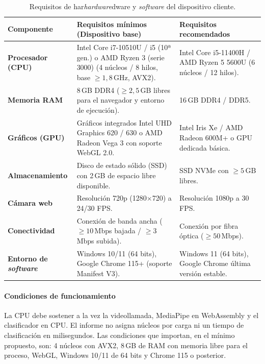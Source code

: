 \begin{table}[H]
\centering
\small
\renewcommand{\arraystretch}{1.3}
\caption{Requisitos de har\textit{hardware}dware y \textit{software} del dispositivo cliente.}
\label{tab:requisitos_hardware}
\begin{tabularx}{\textwidth}{@{}l p{5.5cm} X @{}}
\toprule
\textbf{Componente} & \textbf{Requisitos mínimos (Dispositivo base)} & \textbf{Requisitos recomendados} \\
\midrule
\textbf{Procesador (CPU)} & Intel Core i7-10510U / i5 (10ª gen.) o AMD Ryzen 3 (serie 3000) (4 núcleos / 8 hilos, base $\ge 1{,}8$\,GHz, AVX2). & Intel Core i5-11400H / AMD Ryzen 5 5600U (6 núcleos / 12 hilos). \\
\textbf{Memoria RAM} & 8\,GB DDR4 ($\ge 2{,}5$\,GB libres para el navegador y entorno de ejecución). & 16\,GB DDR4 / DDR5. \\
\textbf{Gráficos (GPU)} & Gráficos integrados Intel UHD Graphics 620 / 630 o AMD Radeon Vega 3 con soporte WebGL 2.0. & Intel Iris Xe / AMD Radeon 600M+ o GPU dedicada básica. \\
\textbf{Almacenamiento} & Disco de estado sólido (SSD) con 2\,GB de espacio libre disponible. & SSD NVMe con $\ge 5$\,GB libres. \\
\textbf{Cámara web} & Resolución 720p (1280$\times$720) a 24/30 FPS. & Resolución 1080p a 30 FPS. \\
\textbf{Conectividad} & Conexión de banda ancha ($\ge 10$\,Mbps bajada / $\ge 3$\,Mbps subida). & Conexión por fibra óptica ($\ge 50$\,Mbps). \\
\textbf{Entorno de \textit{software}} & Windows 10/11 (64 bits), Google Chrome 115+ (soporte Manifest V3). & Windows 11 (64 bits), Google Chrome última versión estable. \\
\bottomrule
\end{tabularx}
\end{table}

\paragraph{Condiciones de funcionamiento}
La CPU debe sostener a la vez la videollamada, MediaPipe en WebAssembly y el clasificador en CPU. El informe no asigna núcleos por carga ni un tiempo de clasificación en milisegundos. Las condiciones que importan, en el mínimo propuesto, son: 4 núcleos con AVX2, 8\,GB de RAM con memoria libre para el proceso, WebGL, Windows 10/11 de 64 bits y Chrome 115 o posterior.

